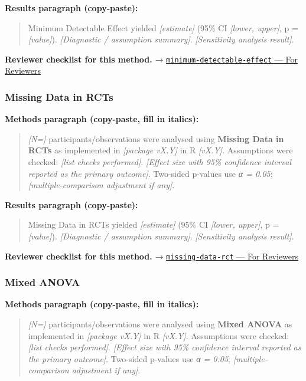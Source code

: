 \documentclass[
]{article}
\begin{document}
\textbf{Results paragraph (copy-paste):}

\begin{quote}
Minimum Detectable Effect yielded \emph{{[}estimate{]}} (95\% CI
\emph{{[}lower, upper{]}}, p = \emph{{[}value{]}}). \emph{{[}Diagnostic
/ assumption summary{]}}. \emph{{[}Sensitivity analysis result{]}}.
\end{quote}

\textbf{Reviewer checklist for this method.} →
\href{../chapters/05-power/minimum-detectable-effect.Rmd\#for-reviewers}{\texttt{minimum-detectable-effect}
--- For Reviewers}

\subsubsection{Missing Data in RCTs}\label{missing-data-in-rcts}

\textbf{Methods paragraph (copy-paste, fill in italics):}

\begin{quote}
\emph{{[}N={]}} participants/observations were analysed using
\textbf{Missing Data in RCTs} as implemented in \emph{{[}package
vX.Y{]}} in R \emph{{[}vX.Y{]}}. Assumptions were checked: \emph{{[}list
checks performed{]}}. \emph{{[}Effect size with 95\% confidence interval
reported as the primary outcome{]}}. Two-sided p-values use \emph{α =
0.05}; \emph{{[}multiple-comparison adjustment if any{]}}.
\end{quote}

\textbf{Results paragraph (copy-paste):}

\begin{quote}
Missing Data in RCTs yielded \emph{{[}estimate{]}} (95\% CI
\emph{{[}lower, upper{]}}, p = \emph{{[}value{]}}). \emph{{[}Diagnostic
/ assumption summary{]}}. \emph{{[}Sensitivity analysis result{]}}.
\end{quote}

\textbf{Reviewer checklist for this method.} →
\href{../chapters/14-clinical/missing-data-rct.Rmd\#for-reviewers}{\texttt{missing-data-rct}
--- For Reviewers}

\subsubsection{Mixed ANOVA}\label{mixed-anova}

\textbf{Methods paragraph (copy-paste, fill in italics):}

\begin{quote}
\emph{{[}N={]}} participants/observations were analysed using
\textbf{Mixed ANOVA} as implemented in \emph{{[}package vX.Y{]}} in R
\emph{{[}vX.Y{]}}. Assumptions were checked: \emph{{[}list checks
performed{]}}. \emph{{[}Effect size with 95\% confidence interval
reported as the primary outcome{]}}. Two-sided p-values use \emph{α =
0.05}; \emph{{[}multiple-comparison adjustment if any{]}}.
\end{quote}
\end{document}
